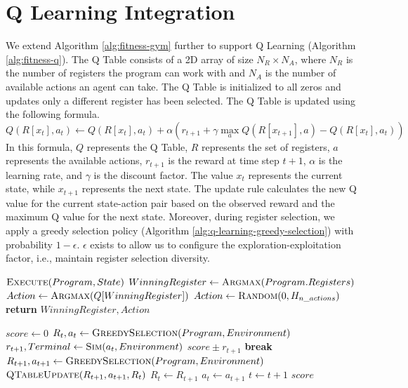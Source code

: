 \documentclass[12pt]{report}
\begin{document}
\section{Q Learning Integration}
We extend Algorithm \ref{alg:fitness-gym} further to support Q Learning (Algorithm \ref{alg:fitness-q}).
The Q Table consists of a 2D array of size $N_R \times N_A$, where $N_R$ is the number of registers the program can work with and $N_A$ is the number of available actions an agent can take. The Q Table is initialized to all zeros and updates only a different register has been selected. The Q Table is updated using the following formula.
\begin{equation}
	Q(R[x_t], a_t) \leftarrow Q(R[x_t], a_t) + \alpha \left(r_{t+1} + \gamma \max_a Q(R[x_{t+1}], a) - Q(R[x_t], a_t)\right)
\end{equation}
In this formula, $Q$ represents the Q Table, $R$ represents the set of registers, $a$ represents the available actions, $r_{t+1}$ is the reward at time step $t+1$, $\alpha$ is the learning rate, and $\gamma$ is the discount factor. The value $x_t$ represents the current state, while $x_{t+1}$ represents the next state. The update rule calculates the new Q value for the current state-action pair based on the observed reward and the maximum Q value for the next state.
Moreover, during register selection, we apply a greedy selection policy (Algorithm \ref{alg:q-learning-greedy-selection}) with probability $1-\epsilon$. $\epsilon$ exists to allow us to configure the exploration-exploitation factor, i.e., maintain register selection diversity.

\begin{algorithm}[!htb]
	\caption{Q Learning: $\epsilon$-Greedy Selection Policy}
	\label{alg:q-learning-greedy-selection}
	\begin{algorithmic}[1]
		\State $\Call{Execute}{Program, State}$
		\State $WinningRegister \gets \Call{Argmax}{Program.Registers} $
		\State $Action \gets \Call{Argmax}{Q[WinningRegister]}$
		\State $Action \gets \Call{Random}{0, H_{n\_actions}}$
		\EndIf
		\State \textbf{return} $WinningRegister, Action$
	\end{algorithmic}
\end{algorithm}
\begin{algorithm}[!htb]
	\caption{Fitness: Q Learning}
	\label{alg:fitness-q}
	\begin{algorithmic}[1]
		\State $score \gets 0$
		\State $R_{t}, a_{t} \gets \Call{GreedySelection}{Program, Environment}$
		\State $r_{t + 1}, Terminal \gets \Call{Sim}{a_{t}, Environment}$
		\State $score \pm r_{t + 1}$
		\State \textbf{break}
		\EndIf
		\State $R_{t+1}, a_{t+1} \gets \Call{GreedySelection}{Program, Environment}$
		\State $\Call{QTableUpdate}{R_{t+1}, a_{t+1}, R_{t}}$
		\EndIf
		\State ${R_{t} \leftarrow R_{t+1}}$
		\State ${a_{t} \leftarrow a_{t+1}}$
		\State ${t \leftarrow t+1}$
		\EndWhile
		\State \Return $score$
	\end{algorithmic}
\end{algorithm}
\end{document}
